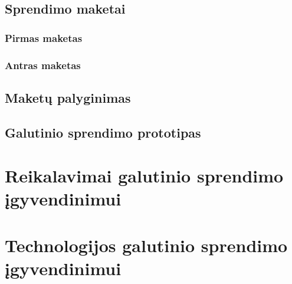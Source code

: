 \documentclass{VUMIFPSkursinis}
\begin{document}
\subsection{Sprendimo maketai}
\subsubsection{Pirmas maketas}

\subsubsection{Antras maketas}

\subsection{Maketų palyginimas}
\subsection{Galutinio sprendimo prototipas}

\section{Reikalavimai galutinio sprendimo įgyvendinimui}
\section{Technologijos galutinio sprendimo įgyvendinimui}




\printbibliography[heading=bibintoc, title=Šaltiniai]  %

\end{document}
